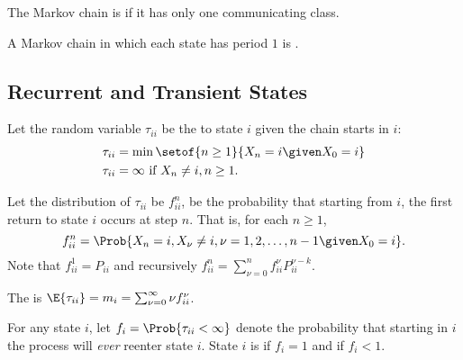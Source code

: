 \documentclass[12pt]{article}
\begin{document}
\begin{definition}
    The Markov chain is  if it has only one
    communicating class.
\end{definition}

\begin{definition}
    A Markov chain in which each state has period \( 1 \) is .
\end{definition}

\subsection*{Recurrent and Transient States}

\begin{definition}
    Let the random variable \( \tau_{ii} \) be the  to
    state \( i \) given the chain starts in \( i \):
    \begin{align*}
        \tau_{ii} &= \min\setof{n \ge 1}{X_n = i \given X_0 = i} \\
        \tau_{ii} &= \infty \text{ if } X_n \ne i, n \ge 1.
    \end{align*}
\end{definition}

\begin{definition}
    Let the distribution of \( \tau_{ii} \) be \( f^n_{ii} \), be the
    probability that starting from \( i \), the first return to state \(
    i \) occurs at step \( n \).  That is, for each \( n \ge 1 \),
    \[
        f^n_{ii} = \Prob{X_n = i, X_\nu \ne i, \nu =1,2,\dots,n-1 \given
        X_0 = i}.
    \] Note that \( f^1_{ii} = P_{ii} \) and recursively \( f^n_{ii} =
    \sum_{\nu=0}^n f^{\nu}_{ii} P^{\nu-k}_{ii} \).
\end{definition}

\begin{definition}
    The  is \( \E{\tau_{ii}} = m_i = \sum_{\nu=0}^
    {\infty} \nu f^\nu_{ii} \).
\end{definition}

\begin{definition}
    For any state \( i \), let \( f_i = \Prob{\tau_{ii} < \infty} \)
    denote the probability that starting in \( i \) the process will
    \emph{ever} reenter state \( i \).  State \( i \) is 
    if \( f_i = 1 \) and  if \( f_{i} < 1 \).
\end{definition}
\end{document}
